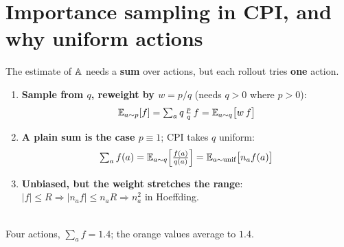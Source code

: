 \section{Importance sampling in CPI, and why uniform actions}
\label{app:is-cpi}

The estimate of $\mathbb{A}$ needs a \textbf{sum} over actions, but each rollout tries \textbf{one} action.

\begin{minipage}[c]{0.54\linewidth}
\begin{enumerate}
  \item \textbf{Sample from $q$, reweight by $w=p/q$} (needs $q>0$ where $p>0$):
  \begin{gather*}
    \mathbb{E}_{a\sim p}[f] = \textstyle\sum_a q\,\frac{p}{q}\,f = \mathbb{E}_{a\sim q}\big[w\,f\big]
  \end{gather*}
  \item \textbf{A plain sum is the case $p\equiv1$}; CPI takes $q$ uniform:
  \begin{gather*}
    \textstyle\sum_a f(a) = \mathbb{E}_{a\sim q}\Big[\frac{f(a)}{q(a)}\Big] = \mathbb{E}_{a\sim\text{unif}}\big[n_a f(a)\big]
  \end{gather*}
  \item \textbf{Unbiased, but the weight stretches the range}: $|f|\le R\Rightarrow|n_af|\le n_aR\Rightarrow n_a^2$ in Hoeffding.
\end{enumerate}
\end{minipage}\hfill
\begin{minipage}[c]{0.43\linewidth}
\centering
{}\\
{\scriptsize Four actions, $\sum_af=1.4$; the orange values average to $1.4$.}
\end{minipage}

